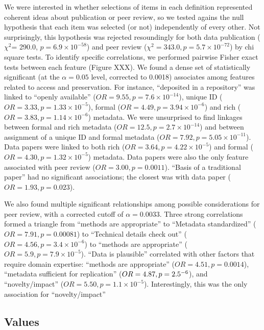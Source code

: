 \documentclass[10pt]{article}
\begin{document}
We were interested in whether selections of items in each definition represented coherent ideas about publication or peer review, so we tested agains the null hypothesis that each item was selected (or not) independently of every other.
Not surprisingly, this hypothesis was rejected resoundingly for both data publication ($\chi^{2}$= 290.0, $p= 6.9\times10^{-58}$) and peer review ($\chi^{2}= 343.0, p= 5.7\times10^{-72}$) by chi square tests.
To identify specific correlations, we performed pairwise Fisher exact tests between each feature (Figure XXX).
We found a dense set of statistically significant (at the $\alpha= 0.05$ level, corrected to 0.0018) associates among features related to access and preservation.
For instance, ``deposited in a repository'' was linked to ``openly available'' ($OR=9.55, p= 7.6\times10^{-14}$), unique ID ($OR= 3.33, p= 1.33\times10^{-5}$), formal ($OR= 4.49, p= 3.94\times10^{-6}$) and rich ($OR= 3.83, p=1.14\times10^{-6}$) metadata.
We were unsurprised to find linkages between formal and rich metadata ($OR= 12.5, p= 2.7\times10^{-14}$) and between assignment of a unique ID and formal metadata ($OR= 7.92, p= 5.05\times10^{-11}$).
Data papers were linked to both rich ($OR=3.64, p=4.22\times10^{-5}$) and formal ($OR=4.30, p=1.32\times10^{-5}$) metadata.
Data papers were also the only feature associated with peer review ($OR=3.00, p=0.0011$).
``Basis of a traditional paper'' had no significant associations; the closest was with data paper ($OR=1.93, p=0.023$).

We also found multiple significant relationships among possible considerations for peer review, with a corrected cutoff of $\alpha=0.0033$.
Three strong correlations formed a triangle from ``methods are appropriate'' to ``Metadata standardized'' ($OR=7.91, p=0.00081$) to ``Technical details check out'' ($OR=4.56, p=3.4\times10^{-6}$) to ``methods are appropriate'' ($OR=5.9, p=7.9\times10^{-5}$).
``Data is plausible'' correlated with other factors that require domain expertise: ``methods are appropriate'' ($OR=4.51, p=0.0014$), ``metadata sufficient for replication'' ($OR=4.87, p=2.5\time10^{-6}$), and ``novelty/impact'' ($OR=5.50, p=1.1\times10^{-5}$).
Interestingly, this was the only association for ``novelty/impact''

\subsection*{Values}
\end{document}
